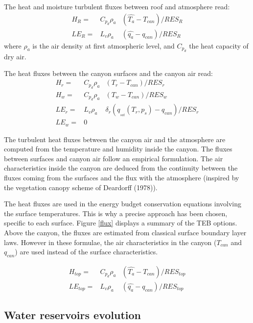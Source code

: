 The heat and moisture turbulent fluxes between roof and atmosphere read:
\begin{eqnarray}
H_{R} =& C_{p_d} \rho_a &(\hat{T_a} - T_{can}) / RES_{R} \nonumber \\
LE_{R} =& L_{v} \rho_a & (\hat{q_a} - q_{can}) / RES_{R} \nonumber
\end{eqnarray}
where $\rho_a$ is the air density at first atmospheric level, and $C_{p_d}$
the heat capacity of dry air.


The heat fluxes between the canyon surfaces and the canyon air read:
\begin{eqnarray}
H_{r} =& C_{p_d} \rho_a &(T_{r} - T_{can}) / RES_{r} \nonumber \\
H_{w} =& C_{p_d} \rho_a &(T_{w} - T_{can}) / RES_{w} \nonumber \\
LE_{r} =& L_{v} \rho_a &\delta_{r}({q_{_{sat}}}(T_{r},p_s) - q_{can}) / RES_{r} \nonumber \\
LE_{w} =& 0\nonumber
\end{eqnarray}


The turbulent heat fluxes between the canyon air and the
atmosphere are computed
from the temperature and humidity inside the canyon.
The fluxes between surfaces and canyon air follow an empirical formulation.
The air characteristics inside the canyon are deduced from the continuity
between the fluxes coming from the surfaces and the flux with the atmosphere
(inspired by the vegetation canopy scheme of Deardorff (1978)).

The heat fluxes are used in the
energy budget conservation equations involving the surface temperatures.
This is why a precise approach has been chosen, specific to each surface.
Figure \ref{flux} displays a summary of the TEB options.\\

Above the canyon, the fluxes are estimated from classical surface boundary
layer laws. However in these formulae, the air characteristics
in the canyon ($T_{can}$ and $q_{can}$)
are used instead of the surface characteristics.

\begin{eqnarray}
H_{top} =& C_{p_d} \rho_a &(\hat{T_a} - T_{can}) / RES_{top} \nonumber \\
LE_{top} =& L_{v} \rho_a & (\hat{q_a} - q_{can}) / RES_{top} \nonumber
\end{eqnarray}


\subsection{Water reservoirs evolution}

